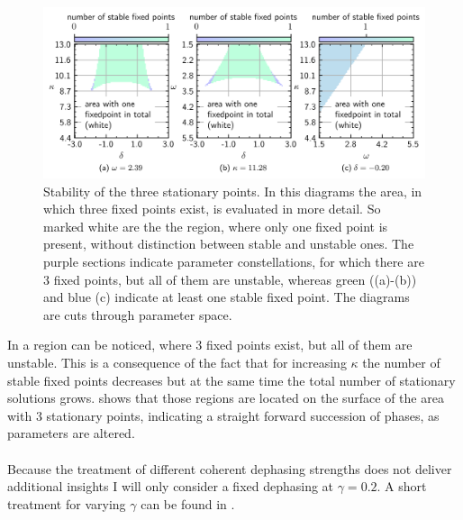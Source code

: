 \begin{figure}[H]
    \vspace*{-0.3cm}
    \includegraphics{pictures/numb_of_fixp_stabcuts2.png}
    \caption{Stability of the three stationary points. In this diagrams the area, in which three fixed points exist, is evaluated in more detail. So marked white are the the region, where only one fixed point is present, without distinction between stable and unstable ones. The purple sections indicate parameter constellations, for which there are 3 fixed points, but all of them are unstable, whereas green ((a)-(b)) and blue (c) indicate at least one stable fixed point. The diagrams are cuts through parameter space.}
    \label{fig:stability_cuts}
\end{figure}
In  a region can be noticed, where 3 fixed points exist, but all of them are unstable. This is a consequence of the fact that for increasing $\kappa$ the number of stable fixed points decreases but at the same time the total number of stationary solutions grows.  shows that those regions are located on the surface of the area with 3 stationary points, indicating a straight forward succession of phases, as parameters are altered.\\\\
Because the treatment of different coherent dephasing strengths does not deliver additional insights I will only consider a fixed dephasing at $\gamma=0.2$. A short treatment for varying $\gamma$ can be found in .
